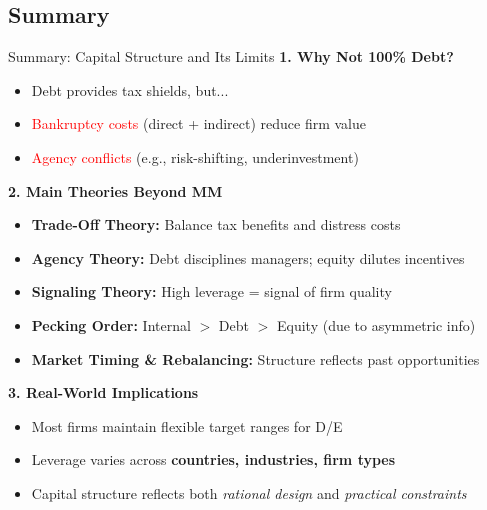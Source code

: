 \subsection*{Summary}
\begin{frame}{Summary: Capital Structure and Its Limits}
	\footnotesize
	\textbf{1. Why Not 100\% Debt?} \\
	\begin{itemize}
		\item Debt provides tax shields, but...
		\item \textcolor{red}{Bankruptcy costs} (direct + indirect) reduce firm value
		\item \textcolor{red}{Agency conflicts} (e.g., risk-shifting, underinvestment)
	\end{itemize}
	
	\textbf{2. Main Theories Beyond MM} \\
	\begin{itemize}
		\item \textbf{Trade-Off Theory:} Balance tax benefits and distress costs
		\item \textbf{Agency Theory:} Debt disciplines managers; equity dilutes incentives
		\item \textbf{Signaling Theory:} High leverage = signal of firm quality
		\item \textbf{Pecking Order:} Internal $>$ Debt $>$ Equity (due to asymmetric info)
		\item \textbf{Market Timing \& Rebalancing:} Structure reflects past opportunities
	\end{itemize}
	
	\textbf{3. Real-World Implications} \\
	\begin{itemize}
		\item Most firms maintain flexible target ranges for D/E
		\item Leverage varies across \textbf{countries, industries, firm types}
		\item Capital structure reflects both \textit{rational design} and \textit{practical constraints}
	\end{itemize}
	
\end{frame}
